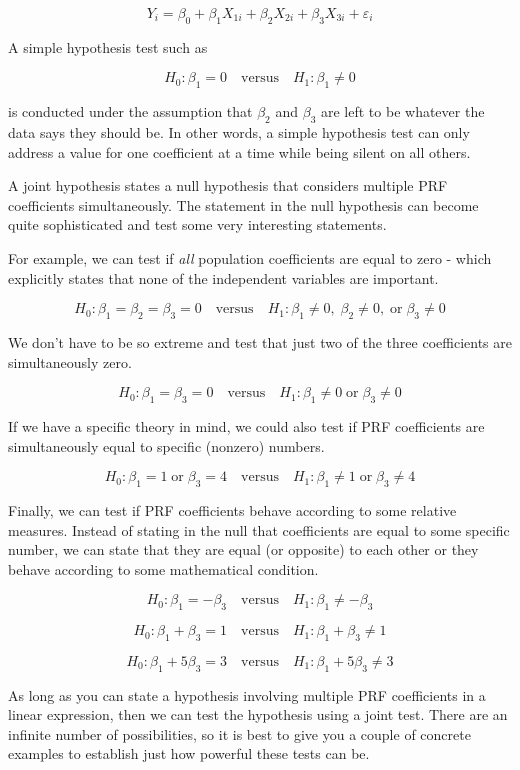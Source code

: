 \documentclass[
]{book}
\begin{document}
\[Y_i = \beta_0 + \beta_1 X_{1i} + \beta_2 X_{2i} + \beta_3 X_{3i} + \varepsilon_i\]

A simple hypothesis test such as

\[H_0: \beta_1 = 0 \quad \text{versus} \quad H_1: \beta_1 \neq 0\]

is conducted under the assumption that \(\beta_2\) and \(\beta_3\) are left to be whatever the data says they should be. In other words, a simple hypothesis test can only address a value for one coefficient at a time while being silent on all others.

A joint hypothesis states a null hypothesis that considers multiple PRF coefficients simultaneously. The statement in the null hypothesis can become quite sophisticated and test some very interesting statements.

For example, we can test if \emph{all} population coefficients are equal to zero - which explicitly states that none of the independent variables are important.

\[H_0: \beta_1 = \beta_2 = \beta_3 = 0 \quad \text{versus} \quad H_1: \beta_1 \neq 0,\; \beta_2 \neq 0,\; \text{or} \; \beta_3 \neq 0\]

We don't have to be so extreme and test that just two of the three coefficients are simultaneously zero.

\[H_0: \beta_1 = \beta_3 = 0 \quad \text{versus} \quad H_1: \beta_1 \neq 0\; \text{or} \; \beta_3 \neq 0\]

If we have a specific theory in mind, we could also test if PRF coefficients are simultaneously equal to specific (nonzero) numbers.

\[H_0: \beta_1 = 1 \; \text{or} \; \beta_3 = 4 \quad \text{versus} \quad H_1: \beta_1 \neq 1\; \text{or} \; \beta_3 \neq 4\]

Finally, we can test if PRF coefficients behave according to some relative measures. Instead of stating in the null that coefficients are equal to some specific number, we can state that they are equal (or opposite) to each other or they behave according to some mathematical condition.

\[H_0: \beta_1 = -\beta_3 \quad \text{versus} \quad H_1: \beta_1 \neq -\beta_3\]

\[H_0: \beta_1 + \beta_3 = 1 \quad \text{versus} \quad H_1: \beta_1 + \beta_3 \neq 1\]

\[H_0: \beta_1 + 5\beta_3 = 3 \quad \text{versus} \quad H_1: \beta_1 + 5\beta_3 \neq 3\]

As long as you can state a hypothesis involving multiple PRF coefficients in a linear expression, then we can test the hypothesis using a joint test. There are an infinite number of possibilities, so it is best to give you a couple of concrete examples to establish just how powerful these tests can be.
\end{document}
